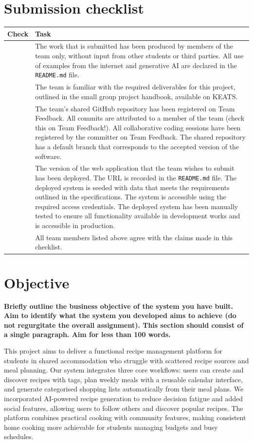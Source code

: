 \documentclass[10pt,a4paper]{article}
\begin{document}
\section*{Submission checklist}
\begin{tabular}{|p{15mm}|p{13cm}|}
\hline
Check & Task \\
\hline
& The work that is submitted has been produced by members of the team only, without input from other students or third parties.  All use of examples from the internet and generative AI are declared in the \texttt{README.md} file.\\
\hline
& The team is familiar with the required deliverables for this project, outlined in the small group project handbook, available on KEATS.\\
\hline
& The team's shared GitHub repository has been registered on Team Feedback.  All commits are attributed to a member of the team (check this on Team Feedback!).  All collaborative coding sessions have been registered by the committer on Team Feedback.  The shared repository has a default branch that corresponds to the accepted version of the software.\\
\hline
& The version of the web application that the team wishes to submit has been deployed.  The URL is recorded in the \texttt{README.md} file.  The deployed system is seeded with data that meets the requirements outlined in the specifications.  The system is accessible using the required access credentials.  The deployed system has been manually tested to ensure all functionality available in development works and is accessible in production.\\
\hline
& All team members listed above agree with the claims made in this checklist.\\
\hline
\end{tabular}


\section*{Objective}
\textbf{Briefly outline the business objective of the system you have built.
Aim to identify what the system you developed aims to achieve
(do not regurgitate the overall assignment).
This section should consist of a single paragraph.  Aim for less than 100 words.}

\vspace{2mm}

\hspace{-7mm} This project aims to deliver a functional recipe management platform
for students in shared accommodation who struggle with scattered recipe sources
and meal planning.
Our system integrates three core workflows:
users can create and discover recipes with tags,
plan weekly meals with a reusable calendar interface,
and generate categorised shopping lists automatically from their meal plans.
We incorporated AI-powered recipe generation to reduce decision fatigue
and added social features, allowing users to follow others and
discover popular recipes.
The platform combines practical cooking with community features,
making consistent home cooking more achievable for students
managing budgets and busy schedules.
\end{document}
